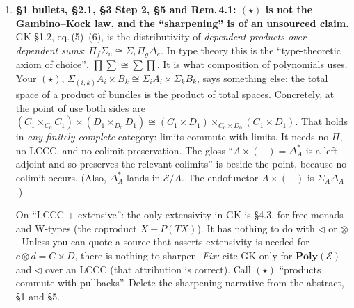 \documentclass[11pt]{article}
\newcommand{\tri}{\mathbin{\triangleleft}}
\newcommand{\Poly}{\mathbf{Poly}}
\newcommand{\E}{\mathcal{E}}
\begin{document}
\begin{enumerate}[label=\textbf{M\arabic*.},leftmargin=*]
\item \textbf{\S1 bullets, \S2.1, \S3 Step 2, \S5 and Rem.\,4.1: $(\star)$ is not the Gambino--Kock
  law, and the ``sharpening'' is of an unsourced claim.} GK \S1.2, eq.\,(5)--(6), is the
  distributivity of \emph{dependent products over dependent sums}:
  $\Pi_f\Sigma_u\cong\Sigma_v\Pi_g\Delta_e$. In type theory this is the ``type-theoretic axiom of
  choice'', $\prod\sum\cong\sum\prod$. It is what composition of polynomials uses. Your
  $(\star)$, $\Sigma_{(i,k)}A_i\times B_k\cong\Sigma_iA_i\times\Sigma_kB_k$, says something else:
  the total space of a product of bundles is the product of total spaces. Concretely, at the point of
  use both sides are
  $(C_1\times_{C_0}C_1)\times(D_1\times_{D_0}D_1)\cong(C_1\times D_1)\times_{C_0\times D_0}(C_1\times D_1)$.
  That holds in \emph{any finitely complete} category: limits commute with limits. It needs no
  $\Pi$, no LCCC, and no colimit preservation. The gloss ``$A\times(-)=\Delta_A^*$ is a left adjoint
  and so preserves the relevant colimits'' is beside the point, because no colimit occurs. (Also,
  $\Delta_A^*$ lands in $\E/A$. The endofunctor $A\times(-)$ is $\Sigma_A\Delta_A$.)

  On ``LCCC + extensive'': the only extensivity in GK is \S4.3, for free monads and W-types (the
  coproduct $X+P(TX)$). It has nothing to do with $\tri$ or $\otimes$. Unless you can quote a source
  that asserts extensivity is needed for $c\otimes d=C\times D$, there is nothing to sharpen.
  \emph{Fix:} cite GK only for $\Poly(\E)$ and $\tri$ over an LCCC (that attribution is correct).
  Call $(\star)$ ``products commute with pullbacks''. Delete the sharpening narrative from the
  abstract, \S1 and \S5.


\end{enumerate}
\end{document}
